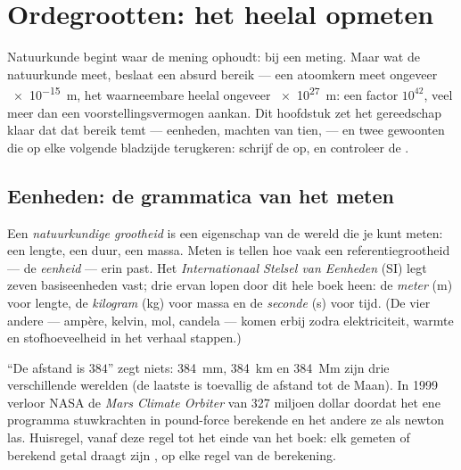 \chapter{Ordegrootten: het heelal opmeten}\label{ch:g10:orders-of-magnitude}

Natuurkunde begint waar de mening ophoudt: bij een meting. Maar wat de
natuurkunde meet, beslaat een absurd bereik --- een atoomkern meet
ongeveer \qty{e-15}{m}, het waarneembare heelal ongeveer \qty{e27}{m}:
een factor $10^{42}$, veel meer dan een voorstellingsvermogen aankan.
Dit hoofdstuk zet het gereedschap klaar dat dat bereik temt ---
eenheden, machten van tien,  --- en twee gewoonten
die op elke volgende bladzijde terugkeren: schrijf de  op, en
controleer de .

\section{Eenheden: de grammatica van het meten}

\begin{definition}\label{def:g10:orders-of-magnitude:unit}
Een \emph{natuurkundige grootheid} is
een eigenschap van de wereld die je kunt meten: een lengte, een duur,
een massa. Meten is tellen hoe vaak een referentiegrootheid --- de
\emph{eenheid} --- erin past. Het
\emph{Internationaal Stelsel van Eenheden} (SI) legt zeven basiseenheden vast; drie ervan
lopen door dit hele boek heen: de \emph{meter}
(\unit{m}) voor lengte, de \emph{kilogram} (\unit{kg})
voor massa en de \emph{seconde} (\unit{s}) voor tijd.
(De vier andere --- ampère, kelvin, mol, candela --- komen erbij zodra
elektriciteit, warmte en stofhoeveelheid in het verhaal stappen.)
\end{definition}

\begin{remark}\label{rem:g10:orders-of-magnitude:units}
``De afstand is $384$'' zegt niets: \qty{384}{mm}, \qty{384}{km} en
\qty{384}{Mm} zijn drie verschillende werelden (de laatste is toevallig
de afstand tot de Maan). In 1999 verloor NASA de \emph{Mars Climate
Orbiter} van 327 miljoen dollar doordat het ene programma stuwkrachten
in pound-force berekende en het andere ze als newton las. Huisregel,
vanaf deze regel tot het einde van het boek: elk gemeten of berekend
getal draagt zijn , op elke regel van de berekening.
\end{remark}

